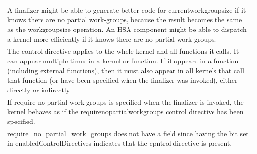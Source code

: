 \documentclass[final]{book}
\begin{document}
\begin{longtable}{@{\hspace{2em}}p{\linewidth-2em}}
A finalizer might be able to generate better code for currentworkgroupsize if it knows there are no partial work-groups, because the result becomes the same as the workgroupsize operation. An HSA component might be able to dispatch a kernel more efficiently if it knows there are no partial work-groups.\\[2mm]
The control directive applies to the whole kernel and all functions it calls. It can appear multiple times in a kernel or function. If it appears in a function (including external functions), then it must also appear in all kernels that call that function (or have been specified when the finalizer was invoked), either directly or indirectly.\\[2mm]
If require no partial work-groups is specified when the finalizer is invoked, the kernel behaves as if the requirenopartialworkgroups control directive has been specified.\\[2mm]
require_no_partial_work_groups does not have a field since having the bit set in enabledControlDirectives indicates that the cpntrol directive is present.
\end{longtable}
\end{document}
